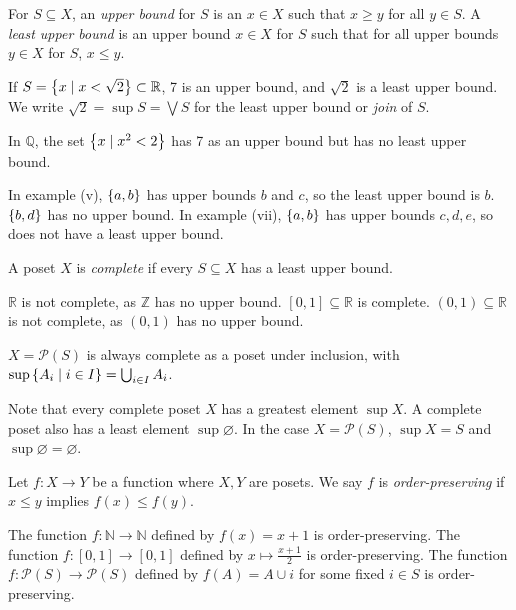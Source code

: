 \begin{definition}
    For \( S \subseteq X \), an \emph{upper bound} for \( S \) is an \( x \in X \) such that \( x \geq y \) for all \( y \in S \).
    A \emph{least upper bound} is an upper bound \( x \in X \) for \( S \) such that for all upper bounds \( y \in X \) for \( S \), \( x \leq y \).
\end{definition}
\begin{example}
    If \( S = \qty{x \mid x < \sqrt{2}} \subset \mathbb R \), 7 is an upper bound, and \( \sqrt{2} \) is a least upper bound.
    We write \( \sqrt{2} = \sup S = \bigvee S \) for the least upper bound or \emph{join} of \( S \).

    In \( \mathbb Q \), the set \( \qty{x \mid x^2 < 2} \) has 7 as an upper bound but has no least upper bound.

    In example (v), \( \qty{a, b} \) has upper bounds \( b \) and \( c \), so the least upper bound is \( b \).
    \( \qty{b, d} \) has no upper bound.
    In example (vii), \( \qty{a, b} \) has upper bounds \( c, d, e \), so does not have a least upper bound.
\end{example}
\begin{definition}
    A poset \( X \) is \emph{complete} if every \( S \subseteq X \) has a least upper bound.
\end{definition}
\begin{example}
    \( \mathbb R \) is not complete, as \( \mathbb Z \) has no upper bound.
    \( [0,1] \subseteq \mathbb R \) is complete.
    \( (0,1) \subseteq \mathbb R \) is not complete, as \( (0,1) \) has no upper bound.
\end{example}
\begin{example}
    \( X = \mathcal P(S) \) is always complete as a poset under inclusion, with \( \sup\qty{A_i \mid i \in I} = \bigcup_{i \in I} A_i \).
\end{example}
Note that every complete poset \( X \) has a greatest element \( \sup X \).
A complete poset also has a least element \( \sup \varnothing \).
In the case \( X = \mathcal P(S) \), \( \sup X = S \) and \( \sup \varnothing = \varnothing \).
\begin{definition}
    Let \( f \colon X \to Y \) be a function where \( X, Y \) are posets.
    We say \( f \) is \emph{order-preserving} if \( x \leq y \) implies \( f(x) \leq f(y) \).
\end{definition}
\begin{example}
    The function \( f \colon \mathbb N \to \mathbb N \) defined by \( f(x) = x + 1 \) is order-preserving.
    The function \( f \colon [0,1] \to [0,1] \) defined by \( x \mapsto \frac{x+1}{2} \) is order-preserving.
    The function \( f \colon \mathcal P(S) \to \mathcal P(S) \) defined by \( f(A) = A \cup \qty{i} \) for some fixed \( i \in S \) is order-preserving.
\end{example}
